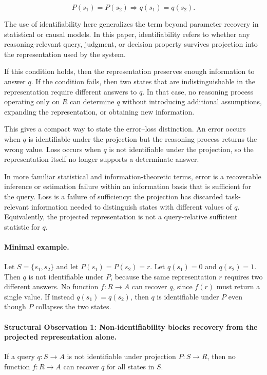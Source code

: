 \documentclass[11pt]{article}
\begin{document}
\[
P(s_1)=P(s_2) \Rightarrow q(s_1)=q(s_2).
\]

The use of identifiability here generalizes the term beyond parameter recovery in statistical or causal models. In this paper, identifiability refers to whether any reasoning-relevant query, judgment, or decision property survives projection into the representation used by the system.

If this condition holds, then the representation preserves enough information to answer $q$. If the condition fails, then two states that are indistinguishable in the representation require different answers to $q$. In that case, no reasoning process operating only on $R$ can determine $q$ without introducing additional assumptions, expanding the representation, or obtaining new information.

This gives a compact way to state the error--loss distinction. An error occurs when $q$ is identifiable under the projection but the reasoning process returns the wrong value. Loss occurs when $q$ is not identifiable under the projection, so the representation itself no longer supports a determinate answer.

In more familiar statistical and information-theoretic terms, error is a recoverable inference or estimation failure within an information basis that is sufficient for the query. Loss is a failure of sufficiency: the projection has discarded task-relevant information needed to distinguish states with different values of $q$. Equivalently, the projected representation is not a query-relative sufficient statistic for $q$.

\paragraph{Minimal example.}
Let $S=\{s_1,s_2\}$ and let $P(s_1)=P(s_2)=r$. Let $q(s_1)=0$ and $q(s_2)=1$. Then $q$ is not identifiable under $P$, because the same representation $r$ requires two different answers. No function $f:R\rightarrow A$ can recover $q$, since $f(r)$ must return a single value. If instead $q(s_1)=q(s_2)$, then $q$ is identifiable under $P$ even though $P$ collapses the two states.

\paragraph{Structural Observation 1: Non-identifiability blocks recovery from the projected representation alone.}
If a query $q:S\rightarrow A$ is not identifiable under projection $P:S\rightarrow R$, then no function $f:R\rightarrow A$ can recover $q$ for all states in $S$.
\end{document}

